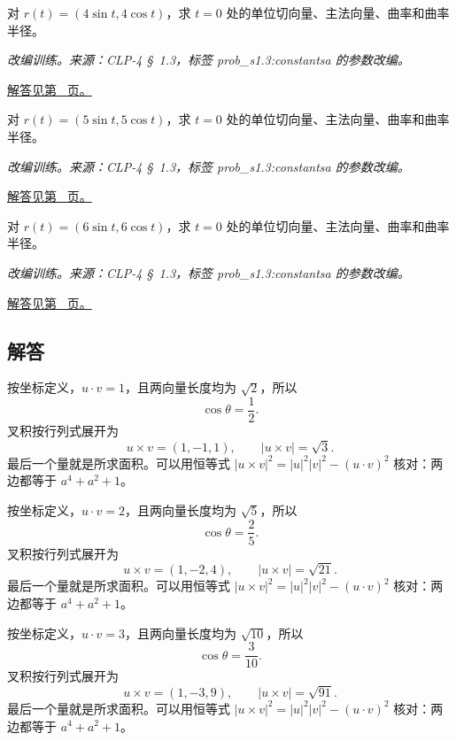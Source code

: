 \documentclass[12pt,fontset=fandol]{ctexart}
\begin{document}
\begin{example}[圆的定向切向与曲率]\label{ex:c31q22}
对 $r(t)=(4\sin t,4\cos t)$，求 $t=0$ 处的单位切向量、主法向量、曲率和曲率半径。
\par\textit{改编训练。来源：CLP-4 \S~1.3，标签 prob\_s1.3:constantsa 的参数改编。}\par\hyperref[ans:c31q22]{解答见第~\pageref{ans:c31q22} 页。}
\end{example}
\begin{example}[圆的定向切向与曲率]\label{ex:c31q23}
对 $r(t)=(5\sin t,5\cos t)$，求 $t=0$ 处的单位切向量、主法向量、曲率和曲率半径。
\par\textit{改编训练。来源：CLP-4 \S~1.3，标签 prob\_s1.3:constantsa 的参数改编。}\par\hyperref[ans:c31q23]{解答见第~\pageref{ans:c31q23} 页。}
\end{example}
\begin{example}[圆的定向切向与曲率]\label{ex:c31q24}
对 $r(t)=(6\sin t,6\cos t)$，求 $t=0$ 处的单位切向量、主法向量、曲率和曲率半径。
\par\textit{改编训练。来源：CLP-4 \S~1.3，标签 prob\_s1.3:constantsa 的参数改编。}\par\hyperref[ans:c31q24]{解答见第~\pageref{ans:c31q24} 页。}
\end{example}
\subsection{解答}
\begin{solve}\label{ans:c31q1}
按坐标定义，$u\cdot v=1$，且两向量长度均为 $\sqrt{2}$，所以
\[
\cos\theta=\frac{1}{2}.
\]
叉积按行列式展开为
\[
u\times v=(1,-1,1),\qquad |u\times v|=\sqrt{3}.
\]
最后一个量就是所求面积。可以用恒等式 $|u\times v|^2=|u|^2|v|^2-(u\cdot v)^2$ 核对：两边都等于 $a^4+a^2+1$。
\end{solve}

\begin{solve}\label{ans:c31q2}
按坐标定义，$u\cdot v=2$，且两向量长度均为 $\sqrt{5}$，所以
\[
\cos\theta=\frac{2}{5}.
\]
叉积按行列式展开为
\[
u\times v=(1,-2,4),\qquad |u\times v|=\sqrt{21}.
\]
最后一个量就是所求面积。可以用恒等式 $|u\times v|^2=|u|^2|v|^2-(u\cdot v)^2$ 核对：两边都等于 $a^4+a^2+1$。
\end{solve}

\begin{solve}\label{ans:c31q3}
按坐标定义，$u\cdot v=3$，且两向量长度均为 $\sqrt{10}$，所以
\[
\cos\theta=\frac{3}{10}.
\]
叉积按行列式展开为
\[
u\times v=(1,-3,9),\qquad |u\times v|=\sqrt{91}.
\]
最后一个量就是所求面积。可以用恒等式 $|u\times v|^2=|u|^2|v|^2-(u\cdot v)^2$ 核对：两边都等于 $a^4+a^2+1$。
\end{solve}
\end{document}
